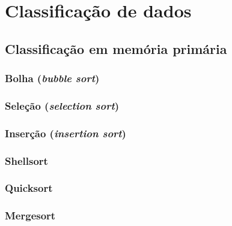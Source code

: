 \chapter{Classificação de dados}

\section{Classificação em memória primária}

\subsection{Bolha (\emph{bubble sort})}

\subsection{Seleção (\emph{selection sort})}

\subsection{Inserção (\emph{insertion sort})}

\subsection{Shellsort}

\subsection{Quicksort}

\subsection{Mergesort}

